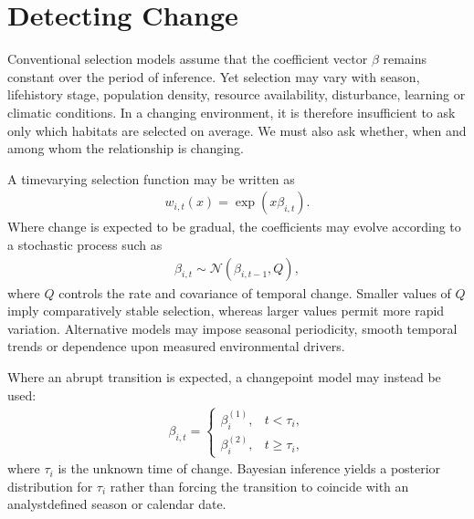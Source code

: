 \documentclass[letterpaper,10pt,english]{sphinxmanual}
\begin{document}
\section{Detecting Change}
\label{\detokenize{theory:detecting-change}}
\sphinxAtStartPar
Conventional selection models assume that the coefficient vector \(\beta\) remains constant over the period of inference. Yet selection may vary with season, life\sphinxhyphen{}history stage, population density, resource availability, disturbance, learning or climatic conditions. In a changing environment, it is therefore insufficient to ask only which habitats are selected on average. We must also ask whether, when and among whom the relationship is changing.

\sphinxAtStartPar
A time\sphinxhyphen{}varying selection function may be written as
\begin{equation*}
\begin{split}
w_{i,t}(x)
=
\exp
\left(
x\beta_{i,t}
\right).
\end{split}
\end{equation*}
\sphinxAtStartPar
Where change is expected to be gradual, the coefficients may evolve according to a stochastic process such as
\begin{equation*}
\begin{split}
\beta_{i,t}
\sim
\mathcal{N}
\left(
\beta_{i,t-1},
Q
\right),
\end{split}
\end{equation*}
\sphinxAtStartPar
where \(Q\) controls the rate and covariance of temporal change. Smaller values of \(Q\) imply comparatively stable selection, whereas larger values permit more rapid variation. Alternative models may impose seasonal periodicity, smooth temporal trends or dependence upon measured environmental drivers.

\sphinxAtStartPar
Where an abrupt transition is expected, a change\sphinxhyphen{}point model may instead be used:
\begin{equation*}
\begin{split}
\beta_{i,t}
=
\begin{cases}
\beta_i^{(1)}, & t < \tau_i,\\
\beta_i^{(2)}, & t \geq \tau_i,
\end{cases}
\end{split}
\end{equation*}
\sphinxAtStartPar
where \(\tau_i\) is the unknown time of change. Bayesian inference yields a posterior distribution for \(\tau_i\) rather than forcing the transition to coincide with an analyst\sphinxhyphen{}defined season or calendar date.
\end{document}
